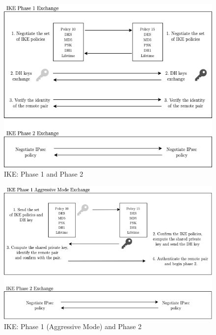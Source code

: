 \documentclass[11pt]{book}
\begin{document}
\begin{figure}[H]
	\centering
	\includegraphics [scale=0.4] {main.png}
	\caption{IKE: Phase 1 and Phase 2}
\end{figure}

\begin{figure}[H]
	\centering
	\includegraphics [scale=0.4] {aggressive.png}
	\caption{IKE: Phase 1 (Aggressive Mode) and Phase 2}
\end{figure}
\end{document}
